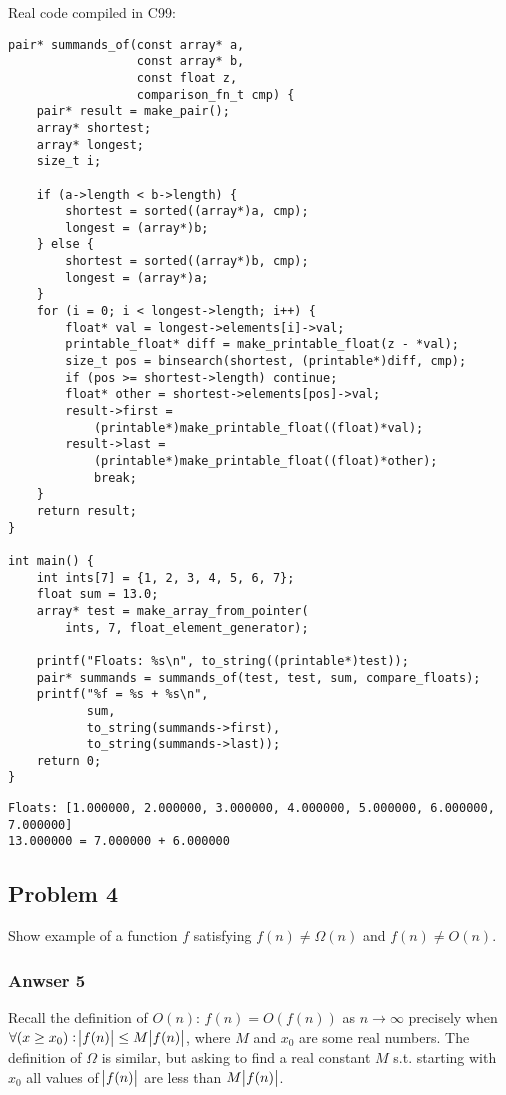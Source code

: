 \documentclass[11pt]{article}
\begin{document}
Real code compiled in C99:

\begin{verbatim}
pair* summands_of(const array* a,
                  const array* b,
                  const float z,
                  comparison_fn_t cmp) {
    pair* result = make_pair();
    array* shortest;
    array* longest;
    size_t i;

    if (a->length < b->length) {
        shortest = sorted((array*)a, cmp);
        longest = (array*)b;
    } else {
        shortest = sorted((array*)b, cmp);
        longest = (array*)a;
    }
    for (i = 0; i < longest->length; i++) {
        float* val = longest->elements[i]->val;
        printable_float* diff = make_printable_float(z - *val);
        size_t pos = binsearch(shortest, (printable*)diff, cmp);
        if (pos >= shortest->length) continue;
        float* other = shortest->elements[pos]->val;
        result->first =
            (printable*)make_printable_float((float)*val);
        result->last =
            (printable*)make_printable_float((float)*other);
            break;
    }
    return result;
}

int main() {
    int ints[7] = {1, 2, 3, 4, 5, 6, 7};
    float sum = 13.0;
    array* test = make_array_from_pointer(
        ints, 7, float_element_generator);

    printf("Floats: %s\n", to_string((printable*)test));
    pair* summands = summands_of(test, test, sum, compare_floats);
    printf("%f = %s + %s\n",
           sum,
           to_string(summands->first),
           to_string(summands->last));
    return 0;
}
\end{verbatim}

\begin{verbatim}
Floats: [1.000000, 2.000000, 3.000000, 4.000000, 5.000000, 6.000000, 7.000000]
13.000000 = 7.000000 + 6.000000
\end{verbatim}


\subsection{Problem 4}
\label{sec:orgheadline9}
Show example of a function \(f\) satisfying \(f(n) \neq \Omega(n)\) and
\(f(n) \neq O(n)\).

\subsubsection{Anwser 5}
\label{sec:orgheadline8}
Recall the definition of \(O(n)\): \(f(n) = O(f(n))\) as \(n \to \infty\)
precisely when \(\forall (x \geq x_0): \abs{f(n)} \leq M \abs{f(n)}\), where
\(M\) and \(x_0\) are some real numbers.  The definition of \(\Omega\) is similar,
but asking to find a real constant \(M\) s.t. starting with \(x_0\) all values
of \(\abs{f(n)}\) are less than \(M\abs{f(n)}\).
\end{document}
